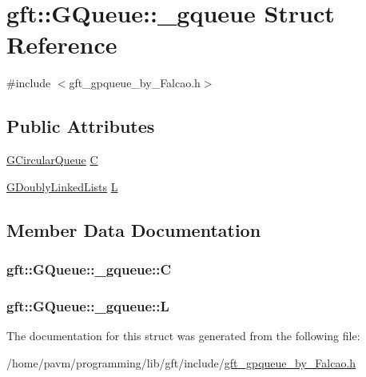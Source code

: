 \hypertarget{structgft_1_1GQueue_1_1__gqueue}{\section{gft\-:\-:G\-Queue\-:\-:\-\_\-gqueue Struct Reference}
\label{structgft_1_1GQueue_1_1__gqueue}
}


{\ttfamily \#include $<$gft\-\_\-gpqueue\-\_\-by\-\_\-\-Falcao.\-h$>$}

\subsection*{Public Attributes}
\begin{DoxyCompactItemize}
\item 
\hyperlink{namespacegft_1_1GQueue_a4e50e86d194a07f26216a096b1f5a067}{G\-Circular\-Queue} \hyperlink{structgft_1_1GQueue_1_1__gqueue_abdb5cf7556a6191b3ff9402a7878e4d4}{C}
\item 
\hyperlink{namespacegft_1_1GQueue_a0e26f1e55446a32e3d979146492805e3}{G\-Doubly\-Linked\-Lists} \hyperlink{structgft_1_1GQueue_1_1__gqueue_a36d476fccc573636194a2aa9451d6a4c}{L}
\end{DoxyCompactItemize}


\subsection{Member Data Documentation}
\hypertarget{structgft_1_1GQueue_1_1__gqueue_abdb5cf7556a6191b3ff9402a7878e4d4}{
\subsubsection[{C}]{ gft\-::\-G\-Queue\-::\-\_\-gqueue\-::\-C}}\label{structgft_1_1GQueue_1_1__gqueue_abdb5cf7556a6191b3ff9402a7878e4d4}
\hypertarget{structgft_1_1GQueue_1_1__gqueue_a36d476fccc573636194a2aa9451d6a4c}{
\subsubsection[{L}]{ gft\-::\-G\-Queue\-::\-\_\-gqueue\-::\-L}}\label{structgft_1_1GQueue_1_1__gqueue_a36d476fccc573636194a2aa9451d6a4c}


The documentation for this struct was generated from the following file\-:\begin{DoxyCompactItemize}
\item 
/home/pavm/programming/lib/gft/include/\hyperlink{gft__gpqueue__by__Falcao_8h}{gft\-\_\-gpqueue\-\_\-by\-\_\-\-Falcao.\-h}\end{DoxyCompactItemize}
